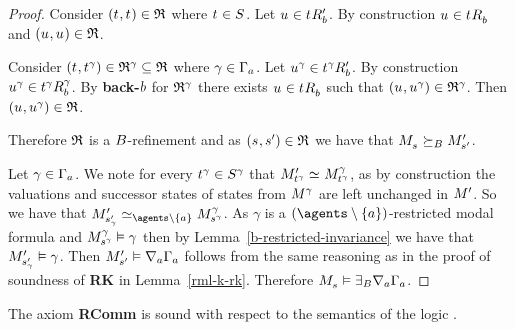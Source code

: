 \begin{proof}
Consider $(\kStateT, \kStateT) \in \refinement$ where $\kStateT \in \kStates$.
Let $\kStateU \in \kSuccessorsPB{\kStateT}$.
By construction $\kStateU \in \kSuccessorsB{\kStateT}$ and $(\kStateU, \kStateU) \in \refinement$.

Consider $(\kStateT, \kStateT[\gamma]) \in \refinement^\gamma \subseteq \refinement$ where $\gamma \in \Gamma_\agentA$.
Let $\kStateU[\gamma] \in \kSuccessorsPB{\kStateT[\gamma]}$.
By construction $\kStateU[\gamma] \in \kSuccessorsB[\gamma]{\kStateT[\gamma]}$.
By {\bf back-$\agentB$} for $\refinement^\gamma$ there exists $\kStateU \in \kSuccessorsB{\kStateT}$ such that $(\kStateU, \kStateU[\gamma]) \in \refinement^\gamma$.
Then $(\kStateU, \kStateU[\gamma]) \in \refinement$.

Therefore $\refinement$ is a $\agentsB$-refinement and as $(\kStateS, \kStateSP) \in \refinement$ we have that $\kPModel{\kStateS} \simulatesBs \kPModelP{\kStateSP}$.

Let $\gamma \in \Gamma_\agentA$.
We note for every $\kStateT[\gamma] \in \kStates[\gamma]$ that $\kPModelP{\kStateT[\gamma]} \bisimilar \kPModel[\gamma]{\kStateT[\gamma]}$, as by construction the valuations and successor states of states from $\kModel[\gamma]$ are left unchanged in $\kModelP$.
So we have that $\kPModelP{\kStateSP_\gamma} \bisimilar[\agents \setminus \{\agentA\}] \kPModel[\gamma]{\kStateS[\gamma]}$.
As $\gamma$ is a $(\agents \setminus \{\agentA\})$-restricted modal formula and $\kPModel[\gamma]{\kStateS[\gamma]} \entails \gamma$ then by Lemma~\ref{b-restricted-invariance} we have that $\kPModelP{\kStateSP_\gamma} \entails \gamma$.
Then $\kPModelP{\kStateSP} \entails \coversA \Gamma_\agentA$ follows from the same reasoning as in the proof of soundness of {\bf RK} in Lemma~\ref{rml-k-rk}.
Therefore $\kPModel{\kStateS} \entails \somerefsBs \coversA \Gamma_\agentA$.
\end{proof}

\begin{lemma}
The axiom {\bf RComm} is sound with respect to the semantics of the logic \logicRmlKD{}.
\end{lemma}

